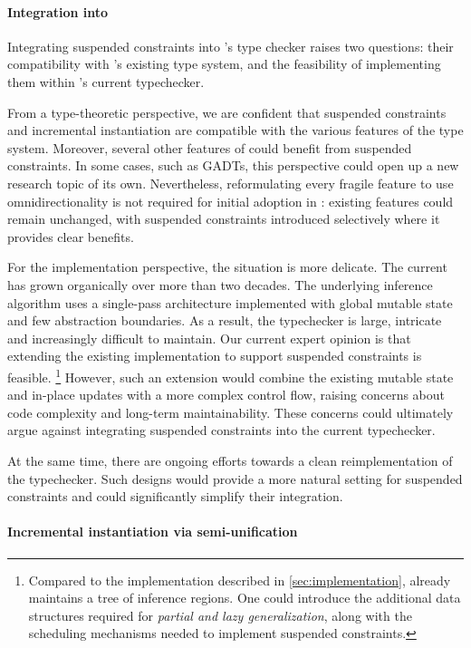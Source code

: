 \documentclass[acmsmall,screen,nonacm%
\Anonymous{,anonymous}{}%
\Final{}{,review}%
]{acmart}
\begin{document}
\paragraph{Integration into \OCaml} 

Integrating suspended constraints into \OCaml's type checker raises two
questions: their compatibility with \OCaml's existing type system, and the
feasibility of implementing them within \OCaml's current typechecker. 

From a type-theoretic perspective, we are confident that suspended constraints
and incremental instantiation are compatible with the various features of the
\OCaml type system. Moreover, several other features of \OCaml could benefit
from suspended constraints. In some cases, such as GADTs, this perspective
could open up a new research topic of its own. Nevertheless, reformulating
every fragile feature to use omnidirectionality is not required for initial
adoption in \OCaml: existing features could remain unchanged, with suspended
constraints introduced selectively where it provides clear benefits. 

For the implementation perspective, the situation is more delicate. The current
\OCaml has grown organically over more than two decades. The underlying
inference algorithm uses a single-pass architecture implemented with global
mutable state and few abstraction boundaries. As a result, the typechecker is
large, intricate and increasingly difficult to maintain. Our current expert
opinion is that extending the existing implementation to support suspended
constraints is feasible.%
\footnote{%
  Compared to the implementation described in \cref{sec:implementation}, \OCaml
  already maintains a tree of inference regions. One could introduce the
  additional data structures required for \emph{partial and lazy
  generalization}, along with the scheduling mechanisms needed to implement
  suspended constraints. 
}
%
However, such an extension would combine the existing mutable state and
in-place updates with a more complex control flow, raising concerns about code
complexity and long-term maintainability. These concerns could ultimately argue
against integrating suspended constraints into the current typechecker. 

At the same time, there are ongoing efforts towards a clean reimplementation of
the \OCaml typechecker. Such designs would provide a more natural setting for
suspended constraints and could significantly simplify their integration.


\paragraph{Incremental instantiation via semi-unification}
\end{document}
